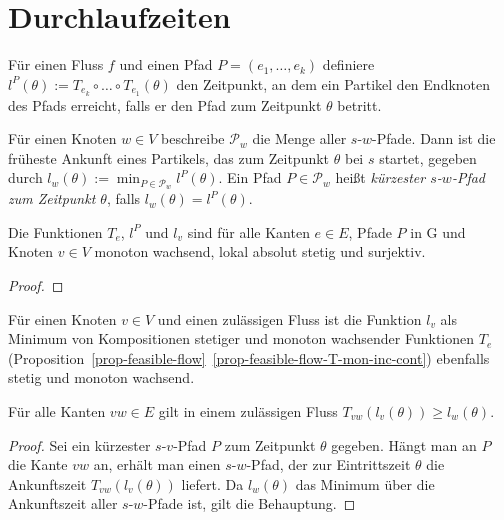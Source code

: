 \section{Durchlaufzeiten}

\begin{definition}
	Für einen Fluss $f$ und einen Pfad $P=(e_1,\dots,e_k)$ definiere $l^P(\theta):=T_{e_k}\circ\dots\circ T_{e_1}(\theta)$ den Zeitpunkt, an dem ein Partikel den Endknoten des Pfads erreicht, falls er den Pfad zum Zeitpunkt $\theta$ betritt.
	
	Für einen Knoten $w\in V$ beschreibe $\mathcal{P}_w$ die Menge aller $s$-$w$-Pfade.
	Dann ist die früheste Ankunft eines Partikels, das zum Zeitpunkt $\theta$ bei $s$ startet, gegeben durch $l_w(\theta):=\min_{P\in\mathcal{P}_w}l^P(\theta)$.
	Ein Pfad $P\in \mathcal{P}_w$ heißt \emph{kürzester $s$-$w$-Pfad zum Zeitpunkt $\theta$},  falls $l_w(\theta)=l^P(\theta)$.
\end{definition}

\begin{proposition}
	Die Funktionen $T_e$, $l^P$ und $l_v$ sind für alle Kanten $e\in E$, Pfade $P$ in G und Knoten $v\in V$ monoton wachsend, lokal absolut stetig und surjektiv.
\end{proposition}
\begin{proof}
\end{proof}


Für einen Knoten $v \in V$ und einen zulässigen Fluss ist die Funktion $l_v$ als Minimum von Kompositionen stetiger und monoton wachsender Funktionen $T_e$ (Proposition~\ref{prop-feasible-flow}~\ref{prop-feasible-flow-T-mon-inc-cont}) ebenfalls stetig und monoton wachsend.


\begin{lemma}\label{lemma-dreicksungl}
	Für alle Kanten $vw\in E$ gilt in einem zulässigen Fluss 
	$T_{vw}(l_v(\theta)) \geq l_w(\theta)$.
\end{lemma}
\begin{proof}
	Sei ein kürzester $s$-$v$-Pfad $P$ zum Zeitpunkt $\theta$ gegeben.
	Hängt man an $P$ die Kante $vw$ an, erhält man einen $s$-$w$-Pfad, der zur Eintrittszeit $\theta$ die Ankunftszeit $T_{vw}(l_v(\theta))$ liefert.
	Da $l_w(\theta)$ das Minimum über die Ankunftszeit aller $s$-$w$-Pfade ist, gilt die Behauptung.
\end{proof}


